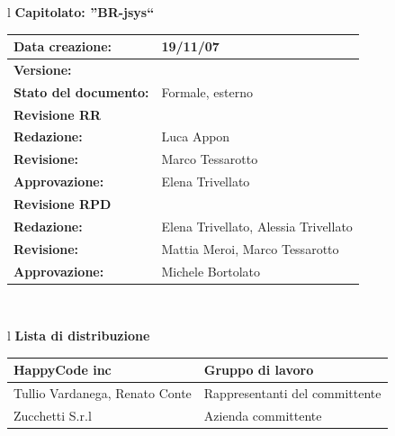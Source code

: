 \documentclass[11pt,titlepage,a4paper]{report}
\begin{document}
\begin{center}
\thispagestyle{plain}
\begin{table}[htbp]
\large{
\begin{tabular}{l}
\Large{\textbf{\textsf{Capitolato: ''BR-jsys``}}} \\
\begin{tabular}{||p{6cm}||p{6cm}||} \hline
\textbf{Data creazione:} & 19/11/07 \\ \hline
\textbf{Versione:} & \lv \\ \hline
\textbf{Stato del documento:} & Formale, esterno \\ \hline
\textbf{Revisione RR} &    \\ \hline
\textbf{Redazione:} & Luca Appon \\ \hline
\textbf{Revisione:} & Marco Tessarotto   \\ \hline
\textbf{Approvazione:}  & Elena Trivellato \\ \hline
\textbf{Revisione RPD} &    \\ \hline
\textbf{Redazione:} & Elena Trivellato, Alessia Trivellato \\ \hline
\textbf{Revisione:} & Mattia Meroi, Marco Tessarotto \\ \hline
\textbf{Approvazione:}  & Michele Bortolato \\ \hline

\end{tabular} \\
\end{tabular}
}
\end{table}

\begin{table}[hbtp]
\large{
\begin{tabular}{l}
\Large{\textbf{\textsf{Lista di distribuzione}}} \\
\begin{tabular}{||p{6cm}||p{6cm}||} \hline
{HappyCode inc}& Gruppo di lavoro\\ \hline
{Tullio Vardanega, Renato Conte}& Rappresentanti del committente \\ \hline
{Zucchetti S.r.l}& Azienda committente\\ \hline
\end{tabular} \\
\end{tabular}
}
\end{table}


\end{center}
\end{document}
